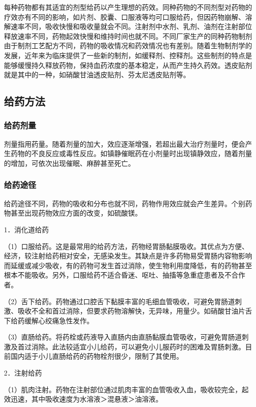 每种药物都有其适宜的剂型给药以产生理想的药效。同种药物的不同剂型对药物的疗效亦有不同的影响，如片剂、胶囊、口服液等均可口服给药，但因药物崩解、溶解速率不同，吸收快慢和吸收量就会不同。注射剂中水剂、乳剂、油剂在注射部位释放速率不同，药物起效快慢和维持时间也就不同。不同厂家生产的同种药物制剂由于制剂工艺配方不同，药物的吸收情况和药效情况也有差别。随着生物制剂学的发展，近年来为临床提供了一些新的制剂，如缓释剂、控释剂。这些制剂的特点是能够缓慢持久释放药物，保持血药浓度的基本稳定，从而产生持久药效。透皮贴剂就是其中的一种，如硝酸甘油透皮贴剂、芬太尼透皮贴剂等。

\subsection{给药方法}

\subsubsection{给药剂量}

剂量指用药量。随着剂量的加大，效应逐渐增强，若超出最大治疗剂量时，便会产生药物的不良反应或毒性反应。如镇静催眠药在小剂量时出现镇静效应，随着剂量的增加，可依次出现催眠、麻醉甚至死亡。

\subsubsection{给药途径}

给药途径不同，药物的吸收和分布也就不同，药物作用效应就会产生差异。个别药物甚至出现药物效应方面的改变，如硫酸镁。

1．消化道给药

（1）口服给药。这是最常用的给药方法，药物经胃肠黏膜吸收。其优点为方便、经济，较注射给药相对安全，无感染发生。其缺点是许多药物易受胃肠内容物影响而延缓或减少吸收，有的药物可发生首过消除，使生物利用度降低，有的药物甚至根本不能吸收。另外，口服给药不适合昏迷、呕吐、抽搐等急重症患者及不合作者。

（2）舌下给药。药物通过口腔舌下黏膜丰富的毛细血管吸收，可避免胃肠道刺激、吸收不全和首过消除，但要求药物溶解快，无异味，用量少。如硝酸甘油片舌下给药缓解心绞痛急性发作。

（3）直肠给药。将药栓或药液导入直肠内由直肠黏膜血管吸收，可避免胃肠道刺激及首过消除。此法较适宜小儿给药，可以避免小儿服药时的困难及胃肠刺激。目前国内适于小儿直肠给药的药物栓剂很少，限制了其使用。

2．注射给药

（1）肌肉注射。药物在注射部位通过肌肉丰富的血管吸收入血，吸收较完全，起效迅速，其中吸收速度为水溶液＞混悬液＞油溶液。

